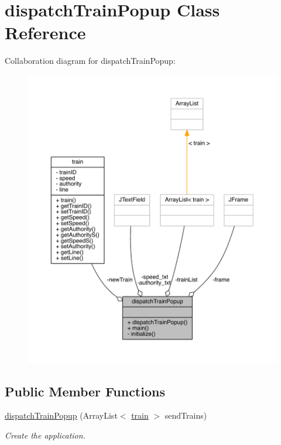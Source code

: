 \hypertarget{classdispatchTrainPopup}{}\section{dispatch\+Train\+Popup Class Reference}
\label{classdispatchTrainPopup}


Collaboration diagram for dispatch\+Train\+Popup\+:
\nopagebreak
\begin{figure}[H]
\begin{center}
\leavevmode
\includegraphics[width=350pt]{classdispatchTrainPopup__coll__graph}
\end{center}
\end{figure}
\subsection*{Public Member Functions}
\begin{DoxyCompactItemize}
\item 
\hyperlink{classdispatchTrainPopup_a993dfedab3089cef6ac33cdee08eb336}{dispatch\+Train\+Popup} (Array\+List$<$ \hyperlink{classtrain}{train} $>$ send\+Trains)
\begin{DoxyCompactList}\small\item\em Create the application. \end{DoxyCompactList}\end{DoxyCompactItemize}
